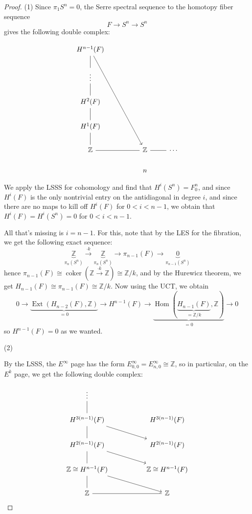 \documentclass[reqno]{amsart}
\theoremstyle{definition}
\theoremstyle{remark}
\DeclareMathOperator{\Hom}{Hom}
\DeclareMathOperator{\coker}{coker}
\DeclareMathOperator{\Ext}{Ext}
\begin{document}
        \begin{proof}
            (1) Since $\pi_1 S^{n} = 0$, the Serre spectral
            sequence to the homotopy fiber sequence
            \[
            F \to S^{n} \to S^{n}
            \] 
            gives the following double complex:



\[\begin{tikzcd}
	{H^{n-1}(F)} \\
	\vdots \\
	{H^2(F)} \\
	{H^1(F)} \\
	{\mathbb{Z}} && {\mathbb{Z}} & \cdots \\
	&& n
	\arrow[from=1-1, to=5-3]
	\arrow[no head, from=2-1, to=1-1]
	\arrow[no head, from=3-1, to=2-1]
	\arrow[no head, from=4-1, to=3-1]
	\arrow[no head, from=5-1, to=4-1]
	\arrow[no head, from=5-1, to=5-3]
	\arrow[no head, from=5-3, to=5-4]
\end{tikzcd}\]

We apply the LSSS for cohomology and find that
$H^{i}(S^{n}) = F_0^{n}$, and since
$H^{i}(F)$ is the only nontrivial entry on the
antidiagonal in degree $i$, and 
since there are no maps to kill off 
$H^{i}(F)$ for $0<i<n-1$, we obtain that
$H^{i}(F) =
H^{i}(S^{n}) = 0$ for $0 < i < n-1$.

All that's missing is $i = n-1$. For this, note that by the LES
for the fibration, we get the following exact sequence:
\[
    \underbrace{\mathbb{Z}}_{\pi_n(S^{n})}
    \stackrel{\cdot k}{\to} \underbrace{\mathbb{Z}}_{\pi_n(S^{n})}
    \to \pi_{n-1}(F) \to \underbrace{0}_{\pi_{n-1}(S^{n})}
\] 
hence $\pi_{n-1}\left(F \right) \cong
\coker \left( \mathbb{Z} \stackrel{\cdot k}{\to} \mathbb{Z} \right) 
\cong \mathbb{Z} / k$, and by the Hurewicz theorem, we
get $H_{n-1}(F) \cong \pi_{n-1}(F) \cong
\mathbb{Z} / k$.
Now using the UCT, we obtain 
\[
    0 \to \underbrace{\Ext \left( H_{n-2}(F), \mathbb{Z} \right)}_{=0}
    \to H^{n-1} (F) \to \underbrace{
        \Hom \left( \underbrace{H_{n-1}(F)}_{=
    \mathbb{Z} / k},\mathbb{Z} \right)}_{=0} \to 0
\] 
so $H^{n-1}(F) = 0$ as we wanted.



(2)

By the LSSS, the $E^{\infty}$ page has the
form $E_{0,0}^{\infty} = E_{n,0}^{\infty} \cong
\mathbb{Z}$, so in particular,
on the $E^{k}$ page, we get the following double complex:


\[\begin{tikzcd}
	\vdots \\
	{H^{3(n-1)}(F)} && {H^{3(n-1)}(F)} \\
	{H^{2(n-1)}(F)} && {H^{2(n-1)}(F)} \\
	{\mathbb{Z}\cong H^{n-1}(F)} && {\mathbb{Z}\cong H^{n-1}(F)} \\
	{\mathbb{Z}} && {\mathbb{Z}}
	\arrow[no head, from=2-1, to=1-1]
	\arrow[from=2-1, to=3-3]
	\arrow[no head, from=3-1, to=2-1]
	\arrow[from=3-1, to=4-3]
	\arrow[no head, from=4-1, to=3-1]
	\arrow[from=4-1, to=5-3]
	\arrow[no head, from=5-1, to=4-1]
	\arrow[no head, from=5-1, to=5-3]
\end{tikzcd}\]


\end{proof}
\end{document}
